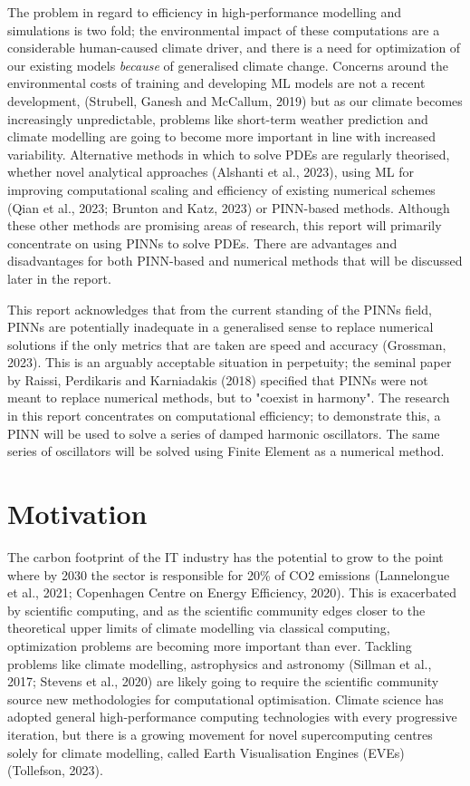 \documentclass[12pt, openany]{book}
\begin{document}
The problem in regard to efficiency in high-performance modelling and simulations is two fold; the environmental impact of these computations are a considerable human-caused climate driver, and there is a need for optimization of our existing models \textit{because} of generalised climate change. Concerns around the environmental costs of training and developing ML models are not a recent development, (Strubell, Ganesh and McCallum, 2019) but as our climate becomes increasingly unpredictable, problems like short-term weather prediction and climate modelling are going to become more important in line with increased variability. Alternative methods in which to solve PDEs are regularly theorised, whether novel analytical approaches (Alshanti et al., 2023), using ML for improving computational scaling and efficiency of existing numerical schemes (Qian et al., 2023; Brunton and Katz, 2023) or PINN-based methods. Although these other methods are promising areas of research, this report will primarily concentrate on using PINNs to solve PDEs. There are advantages and disadvantages for both PINN-based and numerical methods that will be discussed later in the report. \vspace{13pt}

This report acknowledges that from the current standing of the PINNs field, PINNs are potentially inadequate in a generalised sense to replace numerical solutions if the only metrics that are taken are speed and accuracy (Grossman, 2023). This is an arguably acceptable situation in perpetuity; the seminal paper by Raissi, Perdikaris and Karniadakis (2018) specified that PINNs were not meant to replace numerical methods, but to "coexist in harmony". The research in this report concentrates on computational efficiency; to demonstrate this, a PINN will be used to solve a series of damped harmonic oscillators. The same series of oscillators will be solved using Finite Element as a numerical method. \\

\section{Motivation}

The carbon footprint of the IT industry has the potential to grow to the point where by 2030 the sector is responsible for 20{\%} of CO2 emissions (Lannelongue et al., 2021; Copenhagen Centre on Energy Efficiency, 2020). This is exacerbated by scientific computing, and as the scientific community edges closer to the theoretical upper limits of climate modelling via classical computing, optimization problems are becoming more important than ever. Tackling problems like climate modelling, astrophysics and astronomy (Sillman et al., 2017; Stevens et al., 2020) are likely going to require the scientific community source new methodologies for computational optimisation. Climate science has adopted general high-performance computing technologies with every progressive iteration, but there is a growing movement for novel supercomputing centres solely for climate modelling, called Earth Visualisation Engines (EVEs) (Tollefson, 2023). \newline\vspace{1pt}
\end{document}
